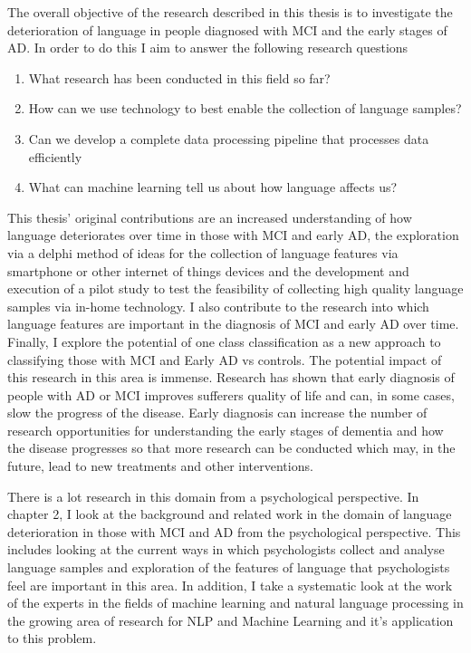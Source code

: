 \par
The overall objective of the research described in this thesis is to investigate the deterioration of language in people diagnosed with MCI and the early stages of AD. In order to do this I aim to answer the following research questions
\begin{enumerate}
	\item What research has been conducted in this field so far?
	\item How can we use technology to best enable the collection of language samples?
	\item Can we develop a complete data processing pipeline that processes data efficiently
	\item What can machine learning tell us about how language affects us?
\end{enumerate} 
\par 
This thesis' original contributions are an increased understanding of how language deteriorates over time in those with MCI and early AD, the exploration via a delphi method of ideas for the collection of language features via smartphone or other internet of things devices and the development and execution of a pilot study to test the feasibility of collecting high quality language samples via in-home technology. I also contribute to the research into which language features are important in the diagnosis of MCI and early AD over time. Finally, I explore the potential of one class classification as a new approach to classifying those with MCI and Early AD vs controls. The potential impact of this research in this area is immense. Research has shown that early diagnosis of people with AD or MCI improves sufferers quality of life and can, in some cases, slow the progress of the disease. Early diagnosis can increase the number of research opportunities for understanding the early stages of dementia and how the disease progresses so that more research can be conducted which may, in the future, lead to new treatments and other interventions.
\par
There is a lot research in this domain from a psychological perspective. In chapter 2, I look at the background and related work in the domain of language deterioration in those with MCI and AD from the psychological perspective. This includes looking at the current ways in which psychologists collect and analyse language samples and exploration of the features of language that psychologists feel are important in this area. In addition, I take a systematic look at the work of the experts in the fields of machine learning and natural language processing in the growing area of research for NLP and Machine Learning and it's application to this problem. 
